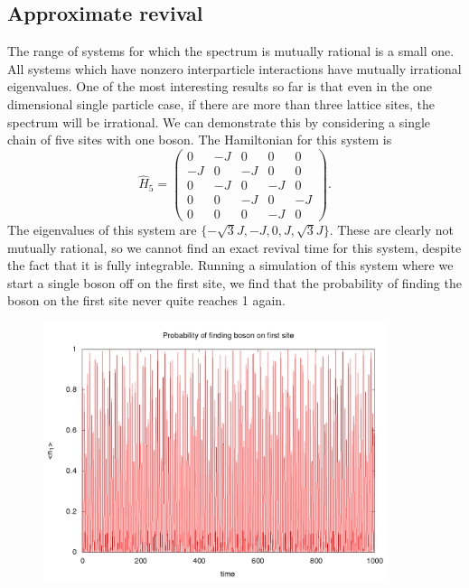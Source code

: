\documentclass[a4paper,10pt]{article}
\theoremstyle{plain}
\begin{document}
\subsection{Approximate revival}

The range of systems for which the spectrum  is
mutually rational is a small one. All systems which have nonzero interparticle
interactions have mutually irrational eigenvalues. One of the most interesting
results so far is that even in the one dimensional single particle case, if
there are more than three lattice sites, the spectrum will be irrational. We can
demonstrate this by considering a single chain of five sites with one boson. The
Hamiltonian for this system is
\begin{equation}
    \hat{H}_{5}
    =
    \begin{pmatrix}
         0 & -J &  0 &  0 &  0 \\
        -J &  0 & -J &  0 &  0 \\
         0 & -J &  0 & -J &  0 \\
         0 &  0 & -J &  0 & -J \\
         0 &  0 &  0 & -J &  0
    \end{pmatrix}.
\end{equation}
The eigenvalues of this system are $\lbrace -\sqrt{3}J, -J, 0, J, \sqrt{3}J
\rbrace$. These are clearly not mutually rational, so we cannot find an exact
revival time for this system, despite the fact that it is fully integrable.
Running a simulation of this system where we start a single boson off on the
first site, we find that the probability of finding the boson on the first site
never quite reaches 1 again.
\begin{figure}[H]
    \centering
    \includegraphics[width=0.9\textwidth]{5_by_1_T1e4_U0}
\end{figure}
\end{document}
